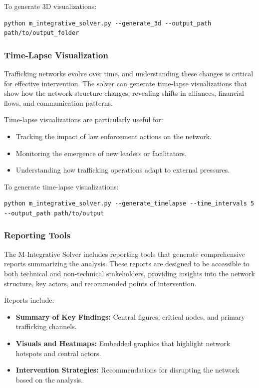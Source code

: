 \documentclass[%
 preprint, linenumbers,
 amsmath,amssymb,
 aps, physrev,
]{revtex4-2}
\begin{document}
To generate 3D visualizations:
\begin{verbatim}
python m_integrative_solver.py --generate_3d --output_path path/to/output_folder
\end{verbatim}

\subsubsection{Time-Lapse Visualization}

Trafficking networks evolve over time, and understanding these changes is critical for effective intervention. The solver can generate time-lapse visualizations that show how the network structure changes, revealing shifts in alliances, financial flows, and communication patterns.

Time-lapse visualizations are particularly useful for:
\begin{itemize}
    \item Tracking the impact of law enforcement actions on the network.
    \item Monitoring the emergence of new leaders or facilitators.
    \item Understanding how trafficking operations adapt to external pressures.
\end{itemize}

To generate time-lapse visualizations:
\begin{verbatim}
python m_integrative_solver.py --generate_timelapse --time_intervals 5 --output_path path/to/output
\end{verbatim}

\subsubsection{Reporting Tools}

The M-Integrative Solver includes reporting tools that generate comprehensive reports summarizing the analysis. These reports are designed to be accessible to both technical and non-technical stakeholders, providing insights into the network structure, key actors, and recommended points of intervention.

Reports include:
\begin{itemize}
    \item \textbf{Summary of Key Findings:} Central figures, critical nodes, and primary trafficking channels.
    \item \textbf{Visuals and Heatmaps:} Embedded graphics that highlight network hotspots and central actors.
    \item \textbf{Intervention Strategies:} Recommendations for disrupting the network based on the analysis.
\end{itemize}
\end{document}

